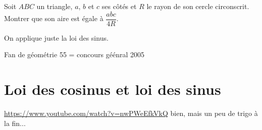 \begin{exo}
Soit $ABC$ un triangle, $a$, $b$ et $c$ ses côtés et $R$ le rayon de son cercle circonscrit.
Montrer que son aire est égale à $\dfrac{abc}{4R}$.
\begin{hint}
\end{hint}
\begin{sol}
On applique juste la loi des sinus.
\end{sol}
\end{exo}

\begin{exo}
\begin{hint}
\end{hint}
\begin{sol}
\end{sol}
\end{exo}


\begin{exo}
Fan de géométrie 55 = concours géénral 2005
\begin{hint}
\end{hint}
\begin{sol}
\end{sol}
\end{exo}

\begin{exo}
\begin{hint}
\end{hint}
\begin{sol}
\end{sol}
\end{exo}


\section{Loi des cosinus et loi des sinus}



\begin{exo}
\begin{hint}
\end{hint}
\begin{sol}
\end{sol}
\end{exo}

\begin{exo}
\url{https://www.youtube.com/watch?v=nwPWeEfkVkQ} bien, mais un peu de trigo à la fin...
\begin{hint}
\end{hint}
\begin{sol}
\end{sol}
\end{exo}






\indications
\correction



